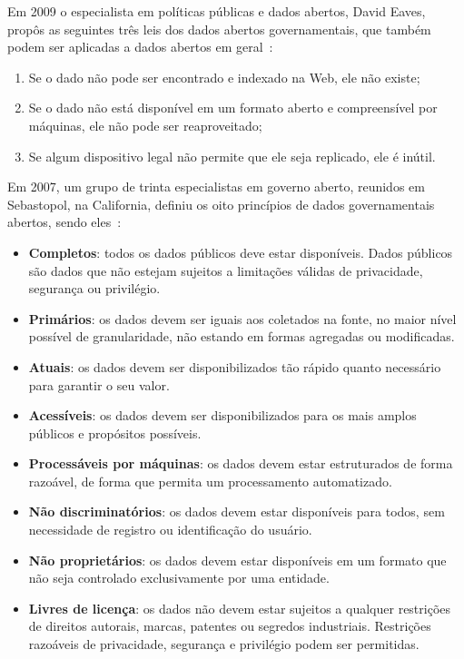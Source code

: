 Em 2009 o especialista em políticas públicas e dados abertos, David Eaves, propôs as seguintes três leis dos dados abertos governamentais, que também podem ser aplicadas a dados abertos em geral~\cite{eaveslaws}:

\begin{enumerate}
\item Se o dado não pode ser encontrado e indexado na Web, ele não existe;

\item Se o dado não está disponível em um formato aberto e compreensível por máquinas, ele não pode ser reaproveitado;

\item Se algum dispositivo legal não permite que ele seja replicado, ele é inútil.

\end{enumerate}

Em 2007, um grupo de trinta especialistas em governo aberto, reunidos em Sebastopol, na California, definiu os oito princípios de dados governamentais abertos, sendo eles~\cite{opengovdata}:

\begin{itemize}
\item \textbf{Completos}: todos os dados públicos deve estar disponíveis. Dados públicos são dados que não estejam sujeitos a limitações válidas de privacidade, segurança ou privilégio.

\item \textbf{Primários}: os dados devem ser iguais aos coletados na fonte, no maior nível possível de granularidade, não estando em formas agregadas ou modificadas.

\item \textbf{Atuais}: os dados devem ser disponibilizados tão rápido quanto necessário para garantir o seu valor.

\item \textbf{Acessíveis}: os dados devem ser disponibilizados para os mais amplos públicos e propósitos possíveis.

\item \textbf{Processáveis por máquinas}: os dados devem estar estruturados de forma razoável, de forma que permita um processamento automatizado.

\item \textbf{Não discriminatórios}: os dados devem estar disponíveis para todos, sem necessidade de registro ou identificação do usuário.

\item \textbf{Não proprietários}: os dados devem estar disponíveis em um formato que não seja controlado exclusivamente por uma entidade.

\item \textbf{Livres de licença}: os dados não devem estar sujeitos a qualquer restrições de direitos autorais, marcas, patentes ou segredos industriais. Restrições razoáveis de privacidade, segurança e privilégio podem ser permitidas.

\end{itemize}


